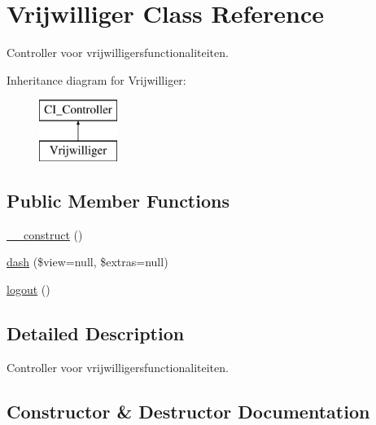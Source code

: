 \hypertarget{class_vrijwilliger}{}\section{Vrijwilliger Class Reference}
\label{class_vrijwilliger}


Controller voor vrijwilligersfunctionaliteiten.  


Inheritance diagram for Vrijwilliger\+:\begin{figure}[H]
\begin{center}
\leavevmode
\includegraphics[height=2.000000cm]{class_vrijwilliger}
\end{center}
\end{figure}
\subsection*{Public Member Functions}
\begin{DoxyCompactItemize}
\item 
\mbox{\hyperlink{class_vrijwilliger_af515ff61252b881037a1c5a8fc3b320a}{\+\_\+\+\_\+construct}} ()
\item 
\mbox{\hyperlink{class_vrijwilliger_aa58c80ff70c366f67133c3ad1d0f40b5}{dash}} (\$view=null, \$extras=null)
\item 
\mbox{\hyperlink{class_vrijwilliger_aced009dfd83a274ae5e079f753502d55}{logout}} ()
\end{DoxyCompactItemize}


\subsection{Detailed Description}
Controller voor vrijwilligersfunctionaliteiten. 

\subsection{Constructor \& Destructor Documentation}
\mbox{\label{class_vrijwilliger_af515ff61252b881037a1c5a8fc3b320a}} 
